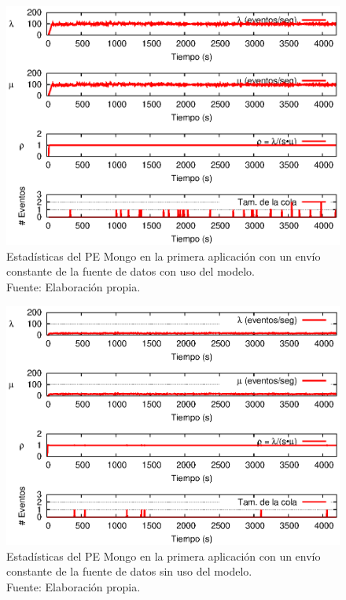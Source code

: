\begin{figure}[!ht]
    \centering
    \captionsetup{justification=centering}
    \includegraphics[scale=1]{images/exp/app1/uniform/cm/statusMongoPE.eps}
    \caption[Estad\'isticas del PE Mongo en la primera aplicaci\'on con un env\'io constante de la fuente de datos con uso del modelo.]{Estad\'isticas del PE Mongo en la primera aplicaci\'on con un env\'io constante de la fuente de datos con uso del modelo.\\Fuente: Elaboraci\'on propia.}
    \label{fig:app1-uniform-statusMongoPE-cm}
\end{figure}

\begin{figure}[!ht]
    \centering
    \captionsetup{justification=centering}
    \includegraphics[scale=1]{images/exp/app1/uniform/sm/statusMongoPE.eps}
    \caption[Estad\'isticas del PE Mongo en la primera aplicaci\'on con un env\'io constante de la fuente de datos sin uso del modelo.]{Estad\'isticas del PE Mongo en la primera aplicaci\'on con un env\'io constante de la fuente de datos sin uso del modelo.\\Fuente: Elaboraci\'on propia.}
    \label{fig:app1-uniform-statusMongoPE-sm}
\end{figure}

